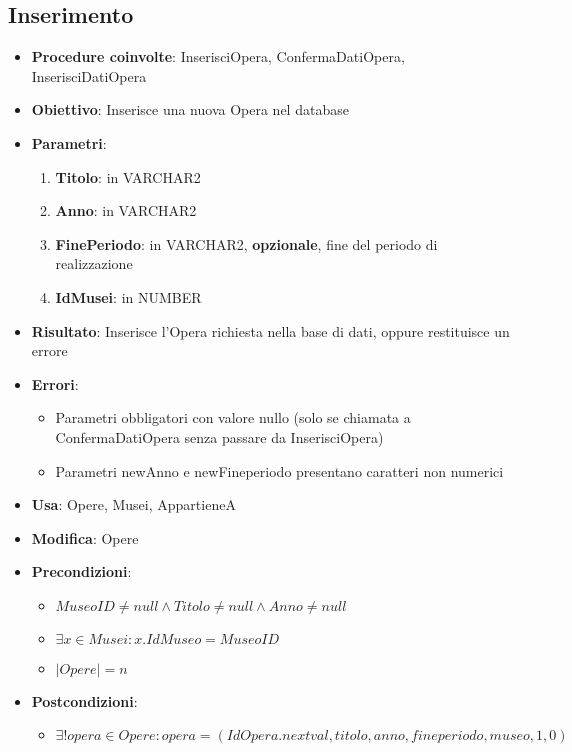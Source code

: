 \subsection{Inserimento}
\begin{itemize}
	\item \textbf{Procedure coinvolte}: InserisciOpera, ConfermaDatiOpera, InserisciDatiOpera
	\item \textbf{Obiettivo}: Inserisce una nuova Opera nel database
	\item \textbf{Parametri}:
	\begin{enumerate}
		\item \textbf{Titolo}: in VARCHAR2
		\item \textbf{Anno}: in VARCHAR2
		\item \textbf{FinePeriodo}: in VARCHAR2, \textbf{opzionale}, fine del periodo di realizzazione 
		\item \textbf{IdMusei}: in NUMBER
	\end{enumerate}
	\item \textbf{Risultato}: Inserisce l'Opera richiesta nella base di dati, oppure restituisce un errore
	\item \textbf{Errori}: 
	\begin{itemize}
		\item Parametri obbligatori con valore nullo (solo se chiamata a ConfermaDatiOpera senza passare da InserisciOpera)
		\item Parametri newAnno e newFineperiodo presentano caratteri non numerici
	\end{itemize}
	\item \textbf{Usa}: Opere, Musei, AppartieneA
	\item \textbf{Modifica}: Opere
	\item \textbf{Precondizioni}:
	\begin{itemize}
		\item $MuseoID \ne null \land Titolo \ne null \land Anno \ne null$
		\item $\exists x \in Musei : x.IdMuseo = MuseoID$
		\item $|Opere| = n$
	\end{itemize}
	\item \textbf{Postcondizioni}:
	\begin{itemize}
		\item $\exists! opera \in Opere : opera = (IdOpera.nextval, titolo, anno, fineperiodo, museo, 1, 0)$
	\end{itemize}
\end{itemize}

